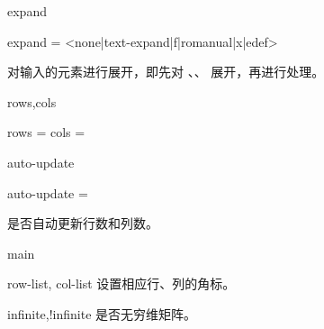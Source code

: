 \documentclass{ctxdoc}
\begin{document}
\begin{function}{expand}
    \begin{syntax}
        expand = <none|text-expand|f|romanual|x|edef> 
    \end{syntax}
    对输入的元素进行展开，即先对 、、 展开，再进行处理。
\end{function}

\begin{function}{rows,cols}
    \begin{syntax}
        rows = 
        cols = 
    \end{syntax}
\end{function}

\begin{function}{auto-update}
    \begin{syntax}
        auto-update = \TTF {}
    \end{syntax}
    是否自动更新行数和列数。
\end{function}

\begin{function}{main}
\end{function}

\begin{function}{row-list, col-list}
    设置相应行、列的角标。
\end{function}

\begin{function}{infinite,!infinite}
    是否无穷维矩阵。
\end{function}
\end{document}
